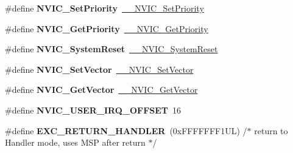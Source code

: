 \begin{DoxyCompactItemize}
\#define {\bfseries N\+V\+I\+C\+\_\+\+Set\+Priority}~\hyperlink{group___c_m_s_i_s___core___n_v_i_c_functions_ga505338e23563a9c074910fb14e7d45fd}{\+\_\+\+\_\+\+N\+V\+I\+C\+\_\+\+Set\+Priority}
\item 
\mbox{\label{group___c_m_s_i_s___core___n_v_i_c_functions_gaf59b9d0a791d2157abb319753953eceb}} 
\#define {\bfseries N\+V\+I\+C\+\_\+\+Get\+Priority}~\hyperlink{group___c_m_s_i_s___core___n_v_i_c_functions_gaeb9dc99c8e7700668813144261b0bc73}{\+\_\+\+\_\+\+N\+V\+I\+C\+\_\+\+Get\+Priority}
\item 
\mbox{\label{group___c_m_s_i_s___core___n_v_i_c_functions_ga6aa0367d3642575610476bf0366f0c48}} 
\#define {\bfseries N\+V\+I\+C\+\_\+\+System\+Reset}~\hyperlink{group___c_m_s_i_s___core___n_v_i_c_functions_ga0d9aa2d30fa54b41eb780c16e35b676c}{\+\_\+\+\_\+\+N\+V\+I\+C\+\_\+\+System\+Reset}
\item 
\mbox{\label{group___c_m_s_i_s___core___n_v_i_c_functions_ga804af63bb4c4c317387897431814775d}} 
\#define {\bfseries N\+V\+I\+C\+\_\+\+Set\+Vector}~\hyperlink{group___c_m_s_i_s___core___n_v_i_c_functions_ga0df355460bc1783d58f9d72ee4884208}{\+\_\+\+\_\+\+N\+V\+I\+C\+\_\+\+Set\+Vector}
\item 
\mbox{\label{group___c_m_s_i_s___core___n_v_i_c_functions_ga955eb1c33a3dcc62af11a8385e8c0fc8}} 
\#define {\bfseries N\+V\+I\+C\+\_\+\+Get\+Vector}~\hyperlink{group___c_m_s_i_s___core___n_v_i_c_functions_ga44b665d2afb708121d9b10c76ff00ee5}{\+\_\+\+\_\+\+N\+V\+I\+C\+\_\+\+Get\+Vector}
\item 
\mbox{\label{group___c_m_s_i_s___core___n_v_i_c_functions_ga8045d905a5ca57437d8e6f71ffcb6df5}} 
\#define {\bfseries N\+V\+I\+C\+\_\+\+U\+S\+E\+R\+\_\+\+I\+R\+Q\+\_\+\+O\+F\+F\+S\+ET}~16
\item 
\mbox{\label{group___c_m_s_i_s___core___n_v_i_c_functions_gaa6fa2b10f756385433e08522d9e4632f}} 
\#define {\bfseries E\+X\+C\+\_\+\+R\+E\+T\+U\+R\+N\+\_\+\+H\+A\+N\+D\+L\+ER}~(0x\+F\+F\+F\+F\+F\+F\+F1\+U\+L)     /$\ast$ return to Handler mode, uses M\+S\+P after return                               $\ast$/

\end{DoxyCompactItemize}
